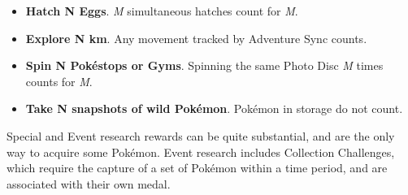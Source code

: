 \begin{itemize}
      Using \textit{M} Berries can count for \textit{M}.
      Use is credited when the Pokémon is caught, runs away, or breaks out of the ball.
      Use is credited when the Trainer leaves the encounter, but if the encounter
       is restarted, this Berry will not be credited again.
  \item \textbf{Hatch \textup{N} Eggs}.
    \textit{M} simultaneous hatches count for \textit{M}.
  \item \textbf{Explore \textup{N} km}.
    Any movement tracked by Adventure Sync counts.  
  \item \textbf{Spin \textup{N} Pokéstops or Gyms}.
    Spinning the same Photo Disc \textit{M} times counts for \textit{M}.
  \item \textbf{Take \textup{N} snapshots of wild Pokémon}.
    Pokémon in storage do not count.
\end{itemize}
Special and Event research rewards can be quite substantial, and are the only way to acquire some Pokémon.
Event research includes Collection Challenges, which require the capture of a set of Pokémon
  within a time period, and are associated with their own medal.


